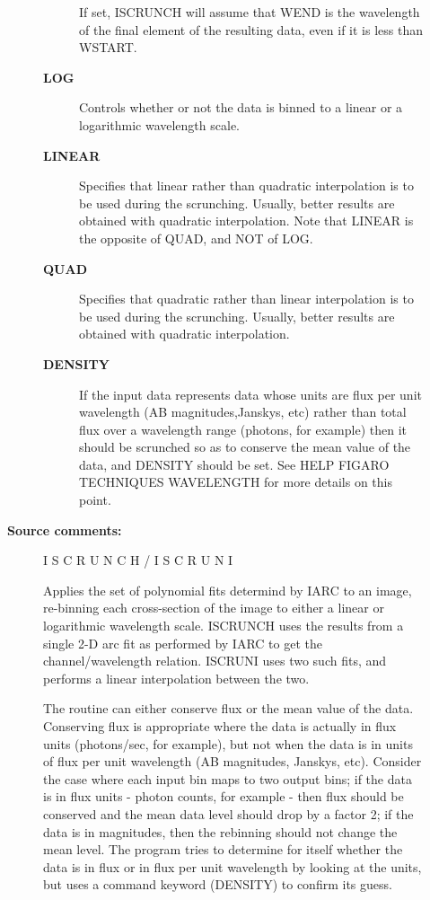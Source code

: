 \begin{description}
\begin{description}
\begin{description}
 If set, ISCRUNCH will assume that WEND is the wavelength of
 the final element of the resulting data, even if it is less
 than WSTART.
\item [\textbf{LOG}]
 Controls whether or not the data is binned to a linear
 or a logarithmic wavelength scale.
\item [\textbf{LINEAR}]
 Specifies that linear rather than quadratic
 interpolation is to be used during the scrunching.  Usually,
 better results are obtained with quadratic interpolation.
 Note that LINEAR is the opposite of QUAD, and NOT of LOG.
\item [\textbf{QUAD}]
 Specifies that quadratic rather than linear
 interpolation is to be used during the scrunching.  Usually,
 better results are obtained with quadratic interpolation.
\item [\textbf{DENSITY}]
 If the input data represents data whose units are flux per
 unit wavelength (AB magnitudes,Janskys, etc) rather than
 total flux over a wavelength range (photons, for example)
 then it should be scrunched so as to conserve the mean
 value of the data, and DENSITY should be set.  See HELP
 FIGARO TECHNIQUES WAVELENGTH for more details on this point.
\end{description}

\item [\textbf{Source comments:}]
\begin{terminalv}
 I S C R U N C H      /      I S C R U N I

 Applies the set of polynomial fits determind by IARC to
 an image, re-binning each cross-section of the image to
 either a linear or logarithmic wavelength scale.  ISCRUNCH
 uses the results from a single 2-D arc fit as performed by
 IARC to get the channel/wavelength relation.  ISCRUNI uses
 two such fits, and performs a linear interpolation between
 the two.

 The routine can either conserve flux or the mean value
 of the data.  Conserving flux is appropriate where the data is
 actually in flux units (photons/sec, for example), but not when
 the data is in units of flux per unit wavelength (AB magnitudes,
 Janskys, etc). Consider the case where each input bin maps to two
 output bins; if the data is in flux units - photon counts, for
 example - then flux should be conserved and the mean data level
 should drop by a factor 2; if the data is in magnitudes, then
 the rebinning should not change the mean level.  The program
 tries to determine for itself whether the data is in flux
 or in flux per unit wavelength by looking at the units, but
 uses a command keyword (DENSITY) to confirm its guess.


\end{terminalv}
\end{description}
\end{description}
